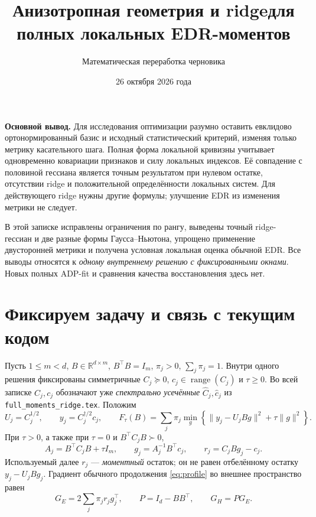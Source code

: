 \documentclass[11pt,a4paper]{article}
\title{Анизотропная геометрия и ridge\newline для полных локальных EDR-моментов}
\author{Математическая переработка черновика}
\date{26 октября 2026 года}
\newcommand{\R}{\mathbb R}
\newcommand{\norm}[1]{\lVert#1\rVert}
\newcommand{\code}[1]{\nolinkurl{#1}}
\theoremstyle{remark}
\begin{document}
\maketitle

\textbf{Основной вывод.}
Для исследования оптимизации разумно оставить евклидово ортонормированный
базис и исходный статистический критерий, изменяя только метрику касательного
шага. Полная форма локальной кривизны учитывает одновременно ковариации
признаков и силу локальных индексов. Её совпадение с половиной гессиана
является точным результатом при нулевом остатке, отсутствии ridge и
положительной определённости локальных систем. Для действующего ridge
нужны другие формулы; улучшение EDR из изменения метрики не следует.

В этой записке исправлены ограничения по рангу, выведены точный ridge-гессиан
и две разные формы Гаусса--Ньютона, упрощено применение двусторонней метрики
и получена условная локальная оценка обычной EDR. Все выводы относятся к
\emph{одному внутреннему решению с фиксированными окнами}. Новых полных
ADP-fit и сравнения качества восстановления здесь нет.

\section{Фиксируем задачу и связь с текущим кодом}

Пусть $1\le m<d$, $B\in\R^{d\times m}$, $B^\top B=I_m$,
$\pi_j>0$, $\sum_j\pi_j=1$. Внутри одного решения фиксированы
симметричные $C_j\succeq0$, $c_j\in\operatorname{range}(C_j)$ и
$\tau\ge0$. Во всей записке $C_j,c_j$ обозначают уже \emph{спектрально
усечённые} $\widehat C_j,\widehat c_j$ из \code{full_moments_ridge.tex}.
Положим
\begin{equation}\label{eq:profile}
 U_j=C_j^{1/2},\qquad y_j=C_j^{\dagger/2}c_j,\qquad
 F_\tau(B)=\sum_j\pi_j\min_g
 \left\{\norm{y_j-U_jBg}^2+\tau\norm{g}^2\right\}.
\end{equation}
При $\tau>0$, а также при $\tau=0$ и $B^\top C_jB\succ0$,
\begin{equation}\label{eq:normal}
 A_j=B^\top C_jB+\tau I_m,\qquad
 g_j=A_j^{-1}B^\top c_j,\qquad r_j=C_jBg_j-c_j.
\end{equation}
Используемый далее $r_j$ --- \emph{моментный} остаток; он не равен
отбелённому остатку $y_j-U_jBg_j$. Градиент обычного продолжения
\eqref{eq:profile} во внешнее пространство равен
\begin{equation}\label{eq:gradient}
 G_E=2\sum_j\pi_jr_jg_j^\top,\qquad
 P=I_d-BB^\top,\qquad G_H=PG_E.
\end{equation}
\end{document}
